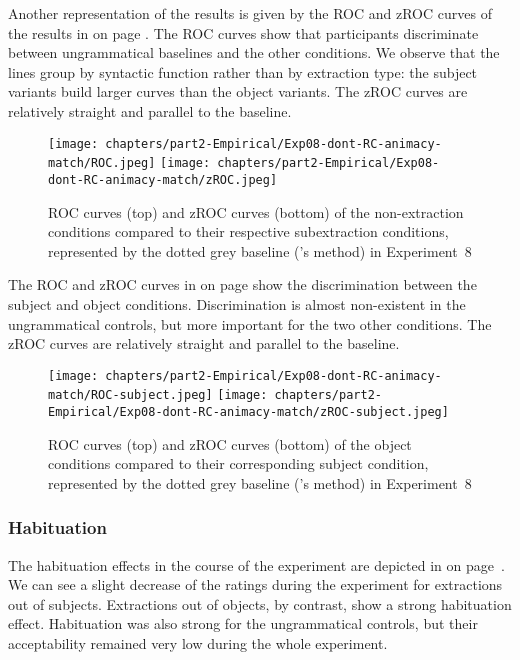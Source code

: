 Another representation of the results is given by the ROC and zROC curves of the results in  on page \pageref{fig:exp08-ROC}. The ROC curves show that participants discriminate between ungrammatical baselines and the other conditions. We observe that the lines group by syntactic function rather than by extraction type: the subject variants build larger curves than the object variants. The zROC curves are relatively straight and parallel to the baseline. 

\begin{figure}
    \centering
    \texttt{[image: chapters/part2-Empirical/Exp08-dont-RC-animacy-match/ROC.jpeg]}
    \texttt{[image: chapters/part2-Empirical/Exp08-dont-RC-animacy-match/zROC.jpeg]}
    \caption{ROC curves (top) and zROC curves (bottom) of the non-extraction conditions compared to their respective subextraction conditions, represented by the dotted grey baseline (\citealt{Dillon.2019}'s method) in Experiment~8}
    \label{fig:exp08-ROC}
\end{figure}

The ROC and zROC curves in  on page \pageref{fig:exp08-ROC-subj} show the discrimination between the subject and object conditions. Discrimination is almost non-existent in the ungrammatical controls, but more important for the two other conditions. The zROC curves are relatively straight and parallel to the baseline.

\begin{figure}
    \centering
    \texttt{[image: chapters/part2-Empirical/Exp08-dont-RC-animacy-match/ROC-subject.jpeg]}
    \texttt{[image: chapters/part2-Empirical/Exp08-dont-RC-animacy-match/zROC-subject.jpeg]}
    \caption{ROC curves (top) and zROC curves (bottom) of the object conditions compared to their corresponding subject condition, represented by the dotted grey baseline (\citealt{Dillon.2019}'s method) in Experiment~8}
    \label{fig:exp08-ROC-subj}
\end{figure}

\subsubsection{Habituation} 

The habituation effects in the course of the experiment are depicted in  on page~\pageref{fig:exp08-habituation}. We can see a slight decrease of the ratings during the experiment for extractions out of subjects. Extractions out of objects, by contrast, show a strong habituation effect. Habituation was also strong for the ungrammatical controls, but their acceptability remained very low during the whole experiment. 

